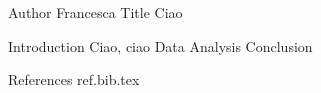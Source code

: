 Author Francesca	
Title Ciao

Introduction Ciao, ciao
Data
Analysis
Conclusion

References 
ref.bib.tex
